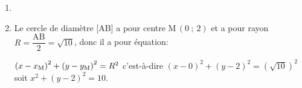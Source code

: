 \documentclass[10pt]{article}
\providecommand{\ds}{\displaystyle}
\begin{document}
\begin{enumerate}
$\begin{gathered}\left \lbrace
\begin{array}{r !{=} l}
x+3y-6 & 0\\
-3x+y+2 & 0
\end{array}
\right .
\iff
\left \lbrace
\begin{array}{r !{=} ll}
3x+9y-18 & 0 & (L_1 \gets 3L_1)\\
-3x+y+2 & 0
\end{array}
\right .\\
\hspace*{1cm}
\iff
\left \lbrace
\begin{array}{r !{=} ll}
x & -3y+6\\
10y-16 & 0 & (L_2 \gets L_1+L_2)
\end{array}
\right .
\iff
\left \lbrace
\begin{array}{r !{=} l}
x & 1,2\\
y& 1,6
\end{array}
\right .\end{gathered}$

Donc le point K a pour coordonnées $(1,2~;~1,6)$.

\item 
{}

\item Le cercle de diamètre [AB] a pour centre M\,$(0~;~2)$ et a pour rayon $R=\dfrac{\text{AB}}{2}=\ds\sqrt{10}$, donc il a pour équation:

$\left ( x-x_{\text M}\right )^2 + \left ( y-y_{\text M} \right )^2 = R^2$
c'est-à-dire 
$\left (x - 0 \right )^2 + \left ( y-2 \right )^2 =  \left (\sqrt{10}\right )^2$
soit
$x^2 + \left (y-2\right )^2=10$.
\end{enumerate}
\end{document}
